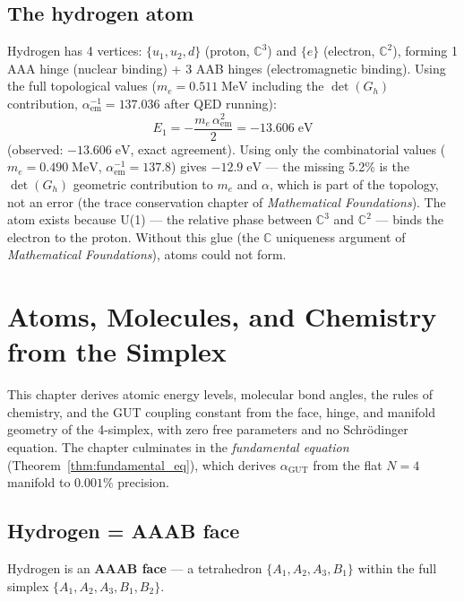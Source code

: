 \documentclass[12pt]{article}
\theoremstyle{remark}
\theoremstyle{definition}
\newcommand{\CC}{\mathbb{C}}
\begin{document}
\subsection{The hydrogen atom}

Hydrogen has 4 vertices: $\{u_1, u_2, d\}$ (proton, $\CC^3$) and $\{e\}$ (electron, $\CC^2$), forming 1 AAA hinge (nuclear binding) + 3 AAB hinges (electromagnetic binding). Using the full topological values ($m_e = 0.511\;\text{MeV}$ including the $\det(G_h)$ contribution, $\alpha_\text{em}^{-1} = 137.036$ after QED running):
\begin{equation}
E_1 = -\frac{m_e\,\alpha_\text{em}^2}{2} = -13.606\;\text{eV}
\end{equation}
(observed: $-13.606\;\text{eV}$, exact agreement). Using only the combinatorial values ($m_e = 0.490\;\text{MeV}$, $\alpha_\text{em}^{-1} = 137.8$) gives $-12.9\;\text{eV}$ --- the missing 5.2\% is the $\det(G_h)$ geometric contribution to $m_e$ and $\alpha$, which is part of the topology, not an error (the trace conservation chapter of \textit{Mathematical Foundations}). The atom exists because U(1) --- the relative phase between $\CC^3$ and $\CC^2$ --- binds the electron to the proton. Without this glue (the $\CC$ uniqueness argument of \textit{Mathematical Foundations}), atoms could not form.

\section{Atoms, Molecules, and Chemistry from the Simplex}
\label{ch:atoms}

This chapter derives atomic energy levels, molecular bond angles, the rules of chemistry, and the GUT coupling constant from the face, hinge, and manifold geometry of the 4-simplex, with zero free parameters and no Schr\"odinger equation.  The chapter culminates in the \emph{fundamental equation} (Theorem~\ref{thm:fundamental_eq}), which derives $\alpha_\text{GUT}$ from the flat $N=4$ manifold to $0.001\%$ precision.

\subsection{Hydrogen = AAAB face}

Hydrogen is an \textbf{AAAB face} --- a tetrahedron $\{A_1, A_2, A_3, B_1\}$ within the full simplex $\{A_1, A_2, A_3, B_1, B_2\}$.
\end{document}
